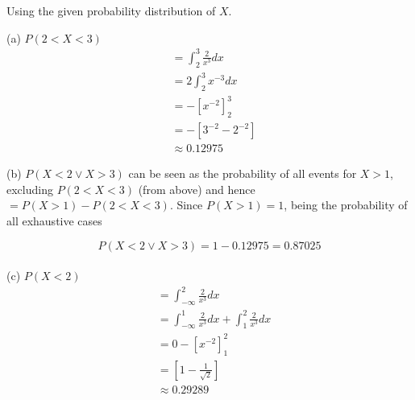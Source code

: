 \documentclass[boxes, qed]{homework}
\begin{document}
\newenvironment{amatrix}[1]{%
  \left[\begin{array}{@{}*{#1}{c}|c@{}}
}{%
  \end{array}\right]
}

\newenvironment{augmatrix}[1]{%
  \left[\begin{array}{#1}
}{%
  \end{array}\right]
}

\begin{problem}Using the given probability distribution of $X$.
\end{problem}
\begin{solution}(a) $P(2 < X < 3)$
  \begin{align*}
    &= \int_{2}^{3}{\frac{2}{x^3}}dx\\
    &= 2\int_{2}^{3}{x^{-3}}dx\\
    &= -\left[ x^{-2} \right]_{2}^{3}\\
    &= -\left[ 3^{-2} - 2^{-2} \right]\\
    &\approx \boxed{0.12975}
  \end{align*}

  (b) $P(X < 2 \lor X > 3)$ can be seen as the probability
    of all events for $X>1$, excluding $P(2 < X < 3)$ (from above)
    and hence $= P(X > 1) - P(2 < X < 3)$.
    Since $P(X > 1)=1$, being the probability of all exhaustive cases

    $$P(X < 2 \lor X > 3) = 1-0.12975 = \boxed{0.87025}$$\\

  (c) $P(X < 2)$
  \begin{align*}
    &= \int_{-\infty}^{2}{\frac{2}{x^3}}dx\\
    &= \int_{-\infty}^{1}{\frac{2}{x^3}}dx + \int_{1}^{2}{\frac{2}{x^3}}dx\\
    &= 0 -\left[ x^{-2} \right]_{1}^{2}\\
    &= \left[ 1-\frac{1}{\sqrt{2}} \right]\\
    &\approx \boxed{0.29289}
  \end{align*}
\end{solution}
\end{document}
